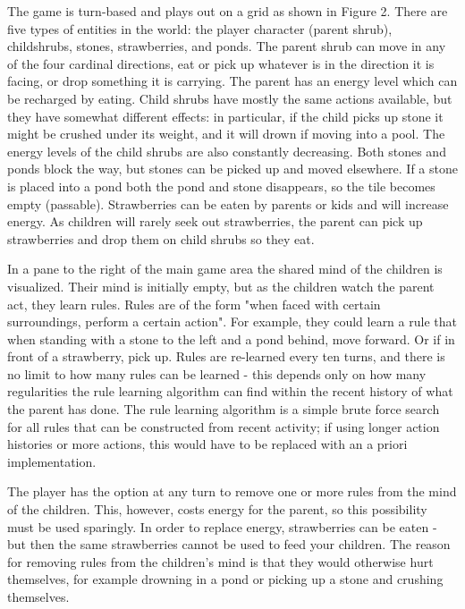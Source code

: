 \documentclass{sig-alternate}
\begin{document}
The game is turn-based and plays out on a grid as shown in Figure
2. There are five types of entities in the world: the player
character (parent shrub), childshrubs, stones, strawberries, and
ponds. The parent shrub can move in any of the four cardinal
directions, eat or pick up whatever is in the direction it is facing,
or drop something it is carrying. The parent has an energy level
which can be recharged by eating. Child shrubs have mostly the
same actions available, but they have somewhat different effects:
in particular, if the child picks up stone it might be crushed under
its weight, and it will drown if moving into a pool. The energy
levels of the child shrubs are also constantly decreasing. Both
stones and ponds block the way, but stones can be picked up and
moved elsewhere. If a stone is placed into a pond both the pond
and stone disappears, so the tile becomes empty (passable).
Strawberries can be eaten by parents or kids and will increase
energy. As children will rarely seek out strawberries, the parent
can pick up strawberries and drop them on child shrubs so they
eat.

In a pane to the right of the main game area the shared mind of the
children is visualized. Their mind is initially empty, but as the
children watch the parent act, they learn rules. Rules are of the
form "when faced with certain surroundings, perform a certain
action". For example, they could learn a rule that when standing
with a stone to the left and a pond behind, move forward. Or if in
front of a strawberry, pick up. Rules are re-learned every ten
turns, and there is no limit to how many rules can be learned - this
depends only on how many regularities the rule learning
algorithm can find within the recent history of what the parent has
done. The rule learning algorithm is a simple brute force search
for all rules that can be constructed from recent activity; if using
longer action histories or more actions, this would have to be
replaced with an a priori implementation.

The player has the option at any turn to remove one or more rules
from the mind of the children. This, however, costs energy for the
parent, so this possibility must be used sparingly. In order to
replace energy, strawberries can be eaten - but then the same
strawberries cannot be used to feed your children. The reason for
removing rules from the children’s mind is that they would
otherwise hurt themselves, for example drowning in a pond or
picking up a stone and crushing themselves.
\end{document}
